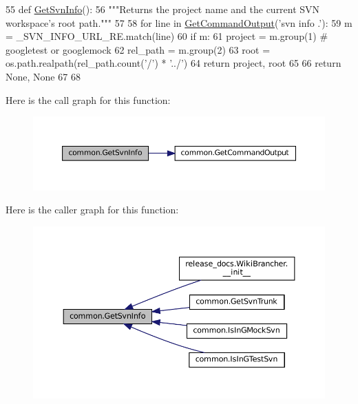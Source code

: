 \begin{DoxyCode}
55 \textcolor{keyword}{def }\hyperlink{namespacecommon_a312d07161b76d965fee6a61e464e283f}{GetSvnInfo}():
56   \textcolor{stringliteral}{"""Returns the project name and the current SVN workspace's root path."""}
57 
58   \textcolor{keywordflow}{for} line \textcolor{keywordflow}{in} \hyperlink{namespacecommon_ac1337758ae23f6a91b44de07408791da}{GetCommandOutput}(\textcolor{stringliteral}{'svn info .'}):
59     m = \_SVN\_INFO\_URL\_RE.match(line)
60     \textcolor{keywordflow}{if} m:
61       project = m.group(1)  \textcolor{comment}{# googletest or googlemock}
62       rel\_path = m.group(2)
63       root = os.path.realpath(rel\_path.count(\textcolor{stringliteral}{'/'}) * \textcolor{stringliteral}{'../'})
64       \textcolor{keywordflow}{return} project, root
65 
66   \textcolor{keywordflow}{return} \textcolor{keywordtype}{None}, \textcolor{keywordtype}{None}
67 
68 
\end{DoxyCode}
Here is the call graph for this function\+:
\nopagebreak
\begin{figure}[H]
\begin{center}
\leavevmode
\includegraphics[width=350pt]{namespacecommon_a312d07161b76d965fee6a61e464e283f_cgraph}
\end{center}
\end{figure}
Here is the caller graph for this function\+:
\nopagebreak
\begin{figure}[H]
\begin{center}
\leavevmode
\includegraphics[width=350pt]{namespacecommon_a312d07161b76d965fee6a61e464e283f_icgraph}
\end{center}
\end{figure}
\mbox{\label{namespacecommon_a9e6483972a8dc0a6a274cbcee69564b0}} 
